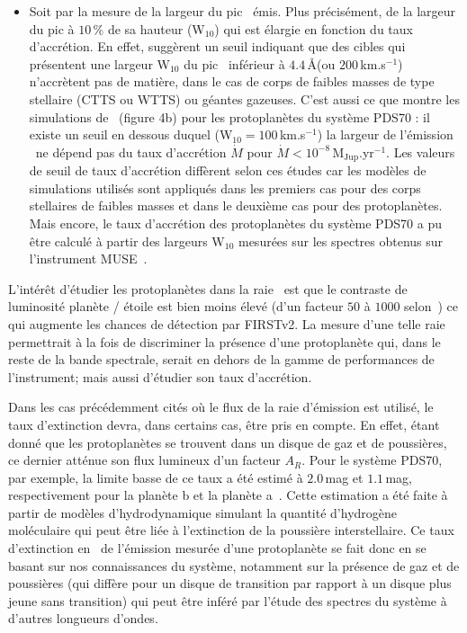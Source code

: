 \begin{itemize}
    \item Soit par la mesure de la largeur du pic \ha~émis. Plus précisément, de la largeur du pic à $10 \, \%$ de sa hauteur (W$_{10}$) qui est élargie en fonction du taux d'accrétion. En effet, \cite{natta2004, fang2009} suggèrent un seuil indiquant que des cibles qui présentent une largeur W$_{10}$ du pic \ha~inférieur à $4.4 \,$\AA (ou $200 \,$km.s$^{-1}$) n'accrètent pas de matière, dans le cas de corps de faibles masses de type stellaire (\ac{CTTS} ou \ac{WTTS}) ou géantes gazeuses. C'est aussi ce que montre les simulations de~\cite{thanathibodee2019} (figure 4b) pour les protoplanètes du système PDS70 : il existe un seuil en dessous duquel (W$_{10} = 100 \,$km.s$^{-1}$) la largeur de l'émission \ha~ne dépend pas du taux d'accrétion $\dot{M}$ pour $\dot{M} < 10^{-8} \,$M$_{\text{Jup}}$.yr$^{-1}$. Les valeurs de seuil de taux d'accrétion diffèrent selon ces études car les modèles de simulations utilisés sont appliqués dans les premiers cas pour des corps stellaires de faibles masses et dans le deuxième cas pour des protoplanètes. Mais encore, le taux d'accrétion des protoplanètes du système PDS70 a pu être calculé à partir des largeurs W$_{10}$ mesurées sur les spectres obtenus sur l'instrument MUSE~\cite{haffert2019, hashimoto2020}.
\end{itemize}

L'intérêt d'étudier les protoplanètes dans la raie \ha~est que le contraste de luminosité planète / étoile est bien moins élevé (d'un facteur $50$ à  $1000$ selon~\cite{close2014}) ce qui augmente les chances de détection par \ac{FIRSTv2}. La mesure d'une telle raie permettrait à la fois de discriminer la présence d'une protoplanète qui, dans le reste de la bande spectrale, serait en dehors de la gamme de performances de l'instrument; mais aussi d'étudier son taux d'accrétion.

Dans les cas précédemment cités où le flux de la raie d'émission est utilisé, le taux d'extinction devra, dans certains cas, être pris en compte. En effet, étant donné que les protoplanètes se trouvent dans un disque de gaz et de poussières, ce dernier atténue son flux lumineux d'un facteur $A_R$. Pour le système PDS70, par exemple, la limite basse de ce taux a été estimé à $2.0 \,$mag et $1.1 \,$mag, respectivement pour la planète b et la planète a~\citep{hashimoto2020}. Cette estimation a été faite à partir de modèles d'hydrodynamique simulant la quantité d'hydrogène moléculaire qui peut être liée à l'extinction de la poussière interstellaire. Ce taux d'extinction en \ha~de l'émission mesurée d'une protoplanète se fait donc en se basant sur nos connaissances du système, notamment sur la présence de gaz et de poussières (qui diffère pour un disque de transition par rapport à un disque plus jeune sans transition) qui peut être inféré par l'étude des spectres du système à d'autres longueurs d'ondes.

